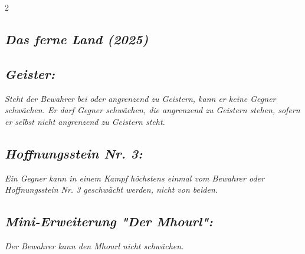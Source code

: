 \documentclass[10pt, a4paper, oneside]{book}
\newcommand{\fan}[1]{\textit{#1}}
\begin{document}
\begin{multicols*}{2}
\begin{bgcolor}
\end{bgcolor}










\begin{bgcolor}
\section{\fan{Das ferne Land (2025)}}


\subsection{\fan{Geister:}}

\fan{Steht der Bewahrer bei oder angrenzend zu Geistern, kann er keine Gegner schwächen. Er darf Gegner schwächen, die angrenzend zu Geistern stehen, sofern er selbst nicht angrenzend zu Geistern steht.}


\subsection{\fan{Hoffnungsstein Nr. 3:}}

\fan{Ein Gegner kann in einem Kampf höchstens einmal vom Bewahrer oder Hoffnungsstein Nr. 3 geschwächt werden, nicht von beiden.}



\subsection{\fan{Mini-Erweiterung "Der Mhourl":}}

\fan{Der Bewahrer kann den Mhourl nicht schwächen.}



\end{bgcolor}


\end{multicols*}
\end{document}
